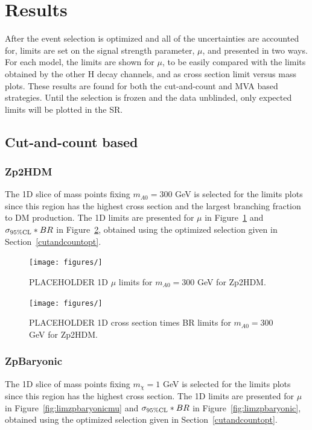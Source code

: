 \section{Results}

After the event selection is optimized and all of the uncertainties are accounted for, limits are set on the signal strength parameter, $\mu$, and presented in two ways. For each model, the limits are shown for $\mu$, to be easily compared with the limits obtained by the other H decay channels, and as cross section limit versus mass plots. These results are found for both the cut-and-count and MVA based strategies. Until the selection is frozen and the data unblinded, only expected limits will be plotted in the SR.

\subsection{Cut-and-count based}

\subsubsection{Zp2HDM}

The 1D slice of mass points fixing $m_{A0} = 300$ GeV is selected for the limits plots since this region has the highest cross section and the largest branching fraction to DM production. The 1D limits are presented for $\mu$ in Figure~\ref{fig:limzp2hdmmu} and $\sigma_{95\% \rm{CL}}*BR$ in Figure~\ref{fig:limzp2hdm}, obtained using the optimized selection given in Section~\ref{cutandcountopt}.  

\begin{figure}[tbh]
\centering
\texttt{[image: figures/]}
\caption{PLACEHOLDER 1D $\mu$ limits for $m_{A0} = 300$ GeV for Zp2HDM.}
\label{fig:limzp2hdmmu}
\end{figure}

\begin{figure}[tbh]
\centering
\texttt{[image: figures/]}
\caption{PLACEHOLDER 1D cross section times BR limits for $m_{A0} = 300$ GeV for Zp2HDM.}
\label{fig:limzp2hdm}
\end{figure}

\subsubsection{ZpBaryonic}

The 1D slice of mass points fixing $m_{\chi} = 1$ GeV is selected for the limits plots since this region has the highest cross section. The 1D limits are presented for $\mu$ in Figure~\ref{fig:limzpbaryonicmu} and $\sigma_{95\% \rm{CL}}*BR$ in Figure~\ref{fig:limzpbaryonic}, obtained using the optimized selection given in Section~\ref{cutandcountopt}.  

